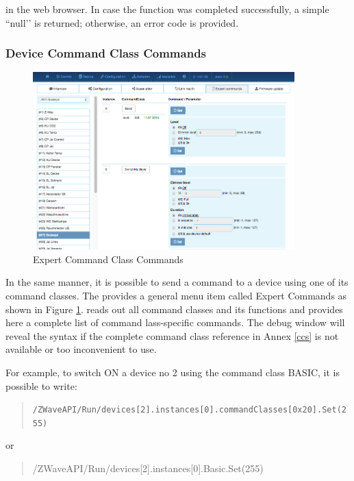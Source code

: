 
in the web browser. In case the function was completed successfully, a simple ``null’’ 
is returned; otherwise, an error code is provided.

\subsubsection{Device Command Class Commands}


\begin{figure}
\begin{center}
\includegraphics[width=0.9\textwidth]{pngs/cap7/eui35.png}
\caption{\zway Expert Command Class Commands}
\label{dev0}
\end{center}
\end{figure}

In the same manner, it is possible to send a command to a device using one of its command 
classes. The \zweui provides a general menu item called Expert Commands as 
shown in Figure \ref{dev0}. \zway reads out all command classes and its functions and
 provides here a complete list of command lass-specific commands. The debug window will 
 reveal the syntax if the complete command class reference in Annex \ref{ccs} is not 
available or too inconvenient to use.


For example, to switch ON a device no 2 using the command class BASIC, it is possible to write:

\begin{quote}
\small{\texttt{/ZWaveAPI/Run/devices[2].instances[0].commandClasses[0x20].Set(255)}}
\end{quote}
or

\begin{quote}
/ZWaveAPI/Run/devices[2].instances[0].Basic.Set(255)
\end{quote}

